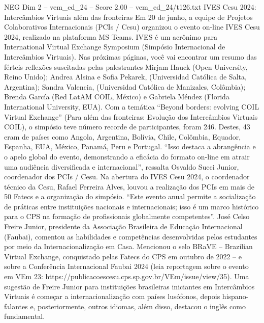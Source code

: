 \begin{textsample}{NEG Dim 2 – vem\_ed\_24 – Score 2.00 – vem\_ed\_24/t126.txt}  \label{ex:f2_neg_148}
IVES Cesu 2024: Intercâmbios Virtuais além das fronteiras Em 20 de junho, a equipe de Projetos Colaborativos Internacionais (PCIs / Cesu) organizou o evento on-line IVES Cesu 2024, realizado na plataforma MS Teams.
IVES é um acrônimo para International Virtual Exchange Symposium (Simpósio Internacional de Intercâmbios Virtuais).
Nas próximas páginas, você vai encontrar um resumo das férteis reflexões suscitadas pelas palestrantes Mirjam Hauck (Open University, Reino Unido); Andrea Alsina e Sofia Pekarek, (Universidad Católica de Salta, Argentina); Sandra Valencia, (Universidad Católica de Manizales, Colômbia); Brenda García (Red LatAM COIL, México) e Gabriela Méndez (Florida International University, EUA).
Com a temática “Beyond borders: evolving COIL Virtual Exchange” (Para além das fronteiras: Evolução dos Intercâmbios Virtuais COIL), o simpósio teve número recorde de participantes, foram 246.
Destes, 43 eram de países como Angola, Argentina, Bolívia, Chile, Colômbia, Equador, Espanha, EUA, México, Panamá, Peru e Portugal. “Isso destaca a abrangência e o apelo global do evento, demonstrando a eficácia do formato on-line em atrair uma audiência diversificada e internacional”, ressalta Osvaldo Succi Junior, coordenador dos PCIs / Cesu.
Na abertura do IVES Cesu 2024, o coordenador técnico da Cesu, Rafael Ferreira Alves, louvou a realização dos PCIs em mais de 50 Fatecs e a organização do simpósio. “Este evento anual permite a socialização de práticas entre instituições nacionais e internacionais; isso é um marco histórico para o CPS na formação de profissionais globalmente competentes”.
José Celso Freire Junior, presidente da Associação Brasileira de Educação Internacional (Faubai), comentou as habilidades e competências desenvolvidas pelos estudantes por meio da Internacionalização em Casa.
Mencionou o selo BRaVE – Brazilian Virtual Exchange, conquistado pelas Fatecs do CPS em outubro de 2022 – e sobre a Conferência Internacional Faubai 2024 (leia reportagem sobre o evento em VEm 23: https://publicacoescesu.cps.sp.gov.br/VEm/issue/view/35).
Uma sugestão de Freire Junior para instituições brasileiras iniciantes em Intercâmbios Virtuais é começar a internacionalização com países lusófonos, depois hispano-falantes e, posteriormente, outros idiomas, além disso, destacou o inglês como fundamental.

\end{textsample}
